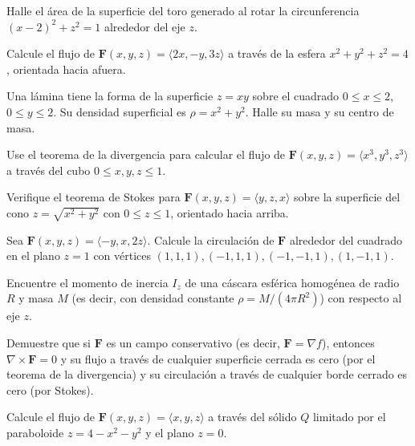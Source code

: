 \begin{prob}
Halle el área de la superficie del toro generado al rotar la circunferencia $(x-2)^2+z^2=1$ alrededor del eje $z$.
\end{prob}

\begin{prob}
Calcule el flujo de $\mathbf{F}(x,y,z)=\langle 2x, -y, 3z\rangle$ a través de la esfera $x^2+y^2+z^2=4$, orientada hacia afuera.
\end{prob}

\begin{prob}
Una lámina tiene la forma de la superficie $z=xy$ sobre el cuadrado $0\le x\le 2$, $0\le y\le 2$. Su densidad superficial es $\rho=x^2+y^2$. Halle su masa y su centro de masa.
\end{prob}

\begin{prob}
Use el teorema de la divergencia para calcular el flujo de $\mathbf{F}(x,y,z)=\langle x^3, y^3, z^3\rangle$ a través del cubo $0\le x,y,z\le 1$.
\end{prob}

\begin{prob}
Verifique el teorema de Stokes para $\mathbf{F}(x,y,z)=\langle y, z, x\rangle$ sobre la superficie del cono $z=\sqrt{x^2+y^2}$ con $0\le z\le 1$, orientado hacia arriba.
\end{prob}

\begin{prob}
Sea $\mathbf{F}(x,y,z)=\langle -y, x, 2z\rangle$. Calcule la circulación de $\mathbf{F}$ alrededor del cuadrado en el plano $z=1$ con vértices $(1,1,1),(-1,1,1),(-1,-1,1),(1,-1,1)$.
\end{prob}

\begin{prob}
Encuentre el momento de inercia $I_z$ de una cáscara esférica homogénea de radio $R$ y masa $M$ (es decir, con densidad constante $\rho = M/(4\pi R^2)$) con respecto al eje $z$.
\end{prob}

\begin{prob}
Demuestre que si $\mathbf{F}$ es un campo conservativo (es decir, $\mathbf{F}=\nabla f$), entonces $\nabla\times\mathbf{F}=0$ y su flujo a través de cualquier superficie cerrada es cero (por el teorema de la divergencia) y su circulación a través de cualquier borde cerrado es cero (por Stokes).
\end{prob}

\begin{prob}
Calcule el flujo de $\mathbf{F}(x,y,z)=\langle x, y, z\rangle$ a través del sólido $Q$ limitado por el paraboloide $z=4-x^2-y^2$ y el plano $z=0$.
\end{prob}
